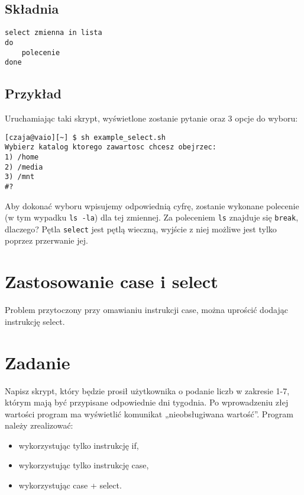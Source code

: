 \subsection{Składnia}

\begin{lstlisting}
select zmienna in lista
do
	polecenie
done
\end{lstlisting}

\subsection{Przykład}


Uruchamiając taki skrypt, wyświetlone zostanie pytanie oraz 3 opcje do wyboru: \newline
\begin{verbatim}
[czaja@vaio][~] $ sh example_select.sh
Wybierz katalog ktorego zawartosc chcesz obejrzec:
1) /home
2) /media
3) /mnt
#?
\end{verbatim}
Aby dokonać wyboru wpisujemy odpowiednią cyfrę, zostanie wykonane polecenie (w tym
wypadku \texttt{ls -la}) dla tej zmiennej. Za poleceniem \texttt{ls} znajduje się \texttt{break}, dlaczego? Pętla \texttt{select} jest pętlą wieczną, wyjście z niej możliwe jest tylko poprzez przerwanie jej.
 
\section{Zastosowanie case i select}
Problem przytoczony przy omawianiu instrukcji case, można uprościć dodając instrukcję select. \newline


\section{Zadanie}
Napisz skrypt, który będzie prosił użytkownika o podanie liczb w zakresie 1-7, którym mają być przypisane  odpowiednie dni tygodnia. Po wprowadzeniu złej wartości program ma wyświetlić komunikat „nieobsługiwana wartość”. Program należy zrealizować:
\begin{itemize}[itemsep=0cm,leftmargin=1cm]
\item wykorzystując tylko instrukcję if,
\item wykorzystując tylko instrukcję case,
\item wykorzystując case + select.
\end{itemize}
